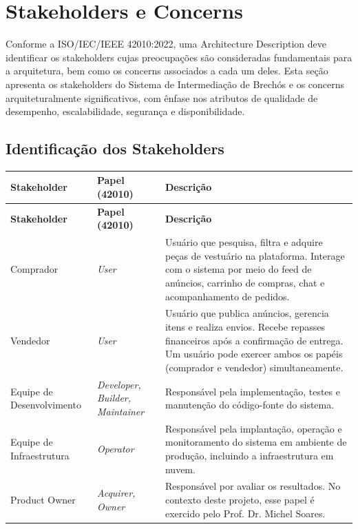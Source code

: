 \documentclass[12pt, a4paper]{article}
\begin{document}
\section{Stakeholders e Concerns}

Conforme a ISO/IEC/IEEE 42010:2022, uma Architecture Description deve identificar os stakeholders cujas preocupações são consideradas fundamentais para a arquitetura, bem como os concerns associados a cada um deles. Esta seção apresenta os stakeholders do Sistema de Intermediação de Brechós e os concerns arquiteturalmente significativos, com ênfase nos atributos de qualidade de desempenho, escalabilidade, segurança e disponibilidade.

\subsection{Identificação dos Stakeholders}

\begin{longtable}{|p{3.5cm}|p{3cm}|p{7.5cm}|}
\hline
\textbf{Stakeholder} & \textbf{Papel (42010)} & \textbf{Descrição} \\
\hline
\endfirsthead
\hline
\textbf{Stakeholder} & \textbf{Papel (42010)} & \textbf{Descrição} \\
\hline
\endhead
Comprador & \textit{User} & Usuário que pesquisa, filtra e adquire peças de vestuário na plataforma. Interage com o sistema por meio do feed de anúncios, carrinho de compras, chat e acompanhamento de pedidos. \\
\hline
Vendedor & \textit{User} & Usuário que publica anúncios, gerencia itens e realiza envios. Recebe repasses financeiros após a confirmação de entrega. Um usuário pode exercer ambos os papéis (comprador e vendedor) simultaneamente. \\
\hline
Equipe de Desenvolvimento & \textit{Developer, Builder, Maintainer} & Responsável pela implementação, testes e manutenção do código-fonte do sistema. \\
\hline
Equipe de Infraestrutura & \textit{Operator} & Responsável pela implantação, operação e monitoramento do sistema em ambiente de produção, incluindo a infraestrutura em nuvem. \\
\hline
Product Owner & \textit{Acquirer, Owner} & Responsável por avaliar os resultados. No contexto deste projeto, esse papel é exercido pelo Prof. Dr. Michel Soares. \\
\hline
\end{longtable}
\end{document}
